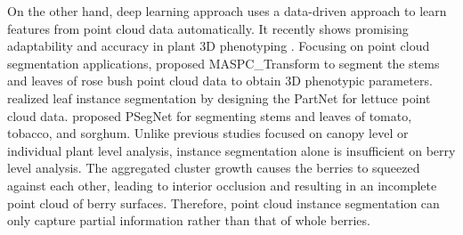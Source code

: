 \documentclass[12pt]{article}
\begin{document}
On the other hand, deep learning approach uses a data-driven approach to learn features from point cloud data automatically. 
It recently shows promising adaptability and accuracy in plant 3D phenotyping \citep{schneider_predicting_2020,scholer_automated_2015,rostami_survey_2019,du_pst_2023}. Focusing on point cloud segmentation applications, 
\citet{li_maspc_2022} proposed MASPC\_Transform to segment the stems and leaves of rose bush point cloud data to obtain 3D phenotypic parameters. 
\citet{wang_3d_2022} realized leaf instance segmentation by designing the PartNet for lettuce point cloud data. 
\citet{li_psegnet_2022} proposed PSegNet for segmenting stems and leaves of tomato, tobacco, and sorghum. 
Unlike previous studies focused on canopy level or individual plant level analysis, instance segmentation alone is insufficient on berry level analysis. 
The aggregated cluster growth \citep{du_instance_2023} causes the berries to squeezed against each other, leading to interior occlusion and resulting in an incomplete point cloud of berry surfaces. 
Therefore, point cloud instance segmentation can only capture partial information rather than that of whole berries.
\end{document}
